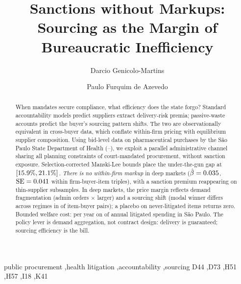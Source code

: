 \documentclass[review,11pt,authoryear]{elsarticle}
\begin{document}
\begin{frontmatter}

\title{Sanctions without Markups:\\ Sourcing as the Margin of Bureaucratic Inefficiency%
}

\author[INSPER]{Darcio Genicolo-Martins}
\author[INSPER]{Paulo Furquim de Azevedo}
\address[INSPER]{Insper Institute of Education and Research,
  Rua Quat\'a 300, S\~ao Paulo, SP 04546-042, Brazil}

\begin{abstract}
When mandates secure compliance, what efficiency does the state
forgo? Standard accountability models
\citep{prendergast2007bureaucrats} predict suppliers extract
delivery-risk premia; passive-waste accounts
\citep{bandiera2009active} predict the buyer's sourcing pattern
shifts. The two are observationally equivalent in cross-buyer data,
which conflate within-firm pricing with equilibrium supplier
composition. Using bid-level data on \BPnPOIfull{} pharmaceutical
purchases by the S\~ao Paulo State Department of Health
(\BPsampleStartYear--\BPsampleEndYear), we exploit a parallel
administrative channel sharing all planning constraints of
court-mandated procurement, without sanction exposure.
Selection-corrected Manski-Lee bounds place the under-the-gun gap
at $[15.9\%, 21.1\%]$. \emph{There is no
within-firm markup} in deep markets
($\hat\beta=0.035$, $\mathrm{SE}=0.041$
within firm-buyer-item triples), with a sanction premium reappearing
on thin-supplier subsamples. In deep markets, the price margin
reflects demand fragmentation (admin orders \BPutgQtyAdminFoldPref$\times$ larger)
and a sourcing shift (modal winner differs across regimes in
\BPwinnerSwitchDiffModalPct{} of item-buyer pairs); a placebo on
never-litigated items returns zero. Bounded welfare cost:
\BPwelfareBound{} per year on \BPwelfareBoundAnnualSpend{} of
annual litigated spending in S\~ao Paulo. The policy lever is
demand aggregation, not contract design: delivery is guaranteed;
sourcing efficiency is the bill.
\end{abstract}

\begin{keyword}
public procurement \sep health litigation \sep accountability \sep sourcing
\JEL D44 \sep D73 \sep H51 \sep H57 \sep I18 \sep K41
\end{keyword}

\end{frontmatter}











\end{document}
